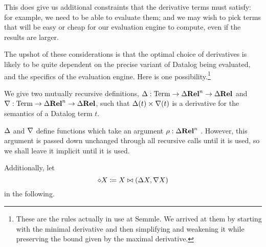 This does give us additional constraints that the derivative terms must satisfy:
for example, we need to be able to evaluate them; and we may wish to pick terms that will be easy or cheap
for our evaluation engine to compute, even if the results are larger.

The upshot of these considerations is that the optimal choice of derivatives is likely
to be quite dependent on the precise variant of Datalog being evaluated, and the
specifics of the evaluation engine. Here is one possibility.\footnote{These are
  the rules actually in use at Semmle. We arrived at them by starting with the
  minimal derivative and then simplifying and weakening it while preserving the
  bound given by the maximal derivative.}

\newcommand{\bothdiff}{\diamond}
\newcommand{\bothchanges}{\rho}
\begin{thm}
\label{thm:concreteDatalog}
  We give two mutually recursive definitions,
  $\Delta: \mathrm{Term} \rightarrow \Delta \mathbf{Rel}^n \rightarrow \Delta \mathbf{Rel}$ and
  $\nabla: \mathrm{Term} \rightarrow \Delta \mathbf{Rel}^n \rightarrow \Delta \mathbf{Rel}$, such
  that $\Delta(t) \times \nabla(t)$ is a derivative for the semantics of a Datalog term $t$.

  $\Delta$ and $\nabla$ define functions which take an argument
  $\bothchanges: \changes{\Rel^n}$ . However, this argument is passed down
  unchanged through all recursive calls until it is used, so we shall leave it
  implicit until it is used.

  Additionally, let
  \begin{displaymath}
    \diamond X \coloneqq X \bowtie (\Delta X, \nabla X)
  \end{displaymath}
  in the following.


\end{thm}
